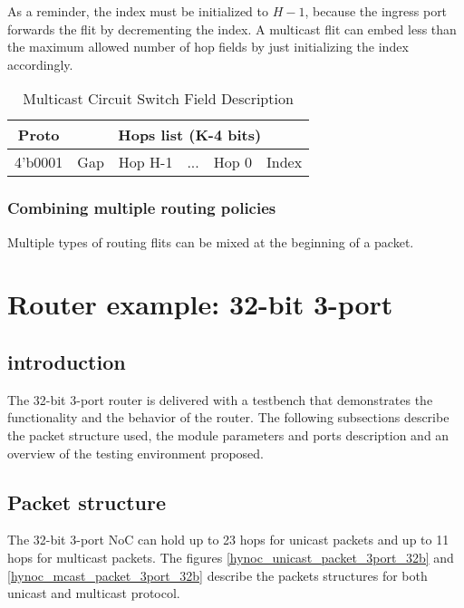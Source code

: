 As a reminder, the index must be initialized to $H-1$, because the ingress port forwards the flit by decrementing the
index. A multicast flit can embed less than the maximum allowed number of hop fields by just initializing the index
accordingly.

\begin{table}[h]
  \centering
  \begin{tabular}{c | c | c | c | c | c}
    \toprule
    \hline
    \textbf{Proto} & \multicolumn{5}{c}{\textbf{Hops list (K-4 bits)}} \\
    \hline\hline
    4'b0001 & Gap & Hop H-1 & ... & Hop 0 & Index \\
    \hline
    \bottomrule
  \end{tabular}
  \caption{Multicast Circuit Switch Field Description}
  \label{multicast_circuit_switch_field}
\end{table}

\subsubsection{Combining multiple routing policies}

Multiple types of routing flits can be mixed at the beginning of a packet.

\section{Router example: 32-bit 3-port}

\subsection{introduction}

The 32-bit 3-port router is delivered with a testbench that demonstrates the functionality and the behavior of the
router. The following subsections describe the packet structure used, the module parameters and ports description and an
overview of the testing environment proposed.

\subsection{Packet structure}

The 32-bit 3-port NoC can hold up to 23 hops for unicast packets and up to 11 hops for multicast packets. The figures
\ref{hynoc_unicast_packet_3port_32b} and \ref{hynoc_mcast_packet_3port_32b} describe the packets structures for both
unicast and multicast protocol.

